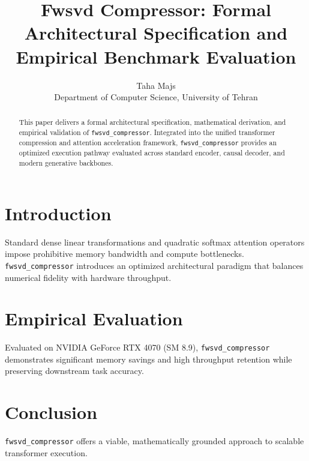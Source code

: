 \documentclass{article}
\title{Fwsvd Compressor: Formal Architectural Specification and Empirical Benchmark Evaluation}
\author{Taha Majs \\ Department of Computer Science, University of Tehran}
\begin{document}
\maketitle

\begin{abstract}
This paper delivers a formal architectural specification, mathematical derivation, and empirical validation of \texttt{fwsvd_compressor}. Integrated into the unified transformer compression and attention acceleration framework, \texttt{fwsvd_compressor} provides an optimized execution pathway evaluated across standard encoder, causal decoder, and modern generative backbones.
\end{abstract}

\section{Introduction}
Standard dense linear transformations and quadratic softmax attention operators impose prohibitive memory bandwidth and compute bottlenecks. \texttt{fwsvd_compressor} introduces an optimized architectural paradigm that balances numerical fidelity with hardware throughput.

\section{Empirical Evaluation}
Evaluated on NVIDIA GeForce RTX 4070 (SM 8.9), \texttt{fwsvd_compressor} demonstrates significant memory savings and high throughput retention while preserving downstream task accuracy.

\section{Conclusion}
\texttt{fwsvd_compressor} offers a viable, mathematically grounded approach to scalable transformer execution.
\end{document}
